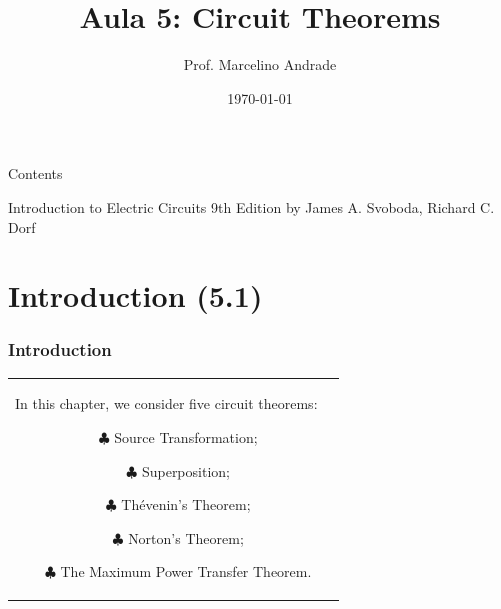 \documentclass[aspectratio=169]{beamer}
\title[\sc{Teoria de Circuitos Eletrônicos 1}]{\LARGE Aula 5: Circuit Theorems}
\author[Prof. Marcelino Andrade]{Prof. Marcelino Andrade}
\institute{Faculdade UnB Gama} %
\date{\today}
\begin{document}
\justifying %
\pagebreak

\begin{frame}
  \titlepage
\end{frame}


\begin{frame}{Contents\newline}

\tableofcontents
\begin{center}	
     		Introduction to Electric Circuits 9th Edition by James A. Svoboda, Richard C. Dorf			
\end{center}	
\end{frame}

\section{Introduction (5.1)}
\begin{frame}[fragile]
	\frametitle{Introduction}
		\begin{tabular}{cc}
			\begin{columns}
				\begin{column}{1\textwidth}  %
					In this chapter, we consider five circuit theorems:	\newline
		
					\begin{itemize}
						\item[$\clubsuit$]{Source Transformation;}
						\item[$\clubsuit$] {Superposition;}	
						\item[$\clubsuit$]{Thévenin's Theorem;}	
						\item[$\clubsuit$]{Norton’s Theorem;}	
						\item[$\clubsuit$]{The Maximum Power Transfer Theorem.\newline}				
					\end{itemize}
					
				\end{column}
			\end{columns}
		
	\end{tabular}
\end{frame}

\end{document}
